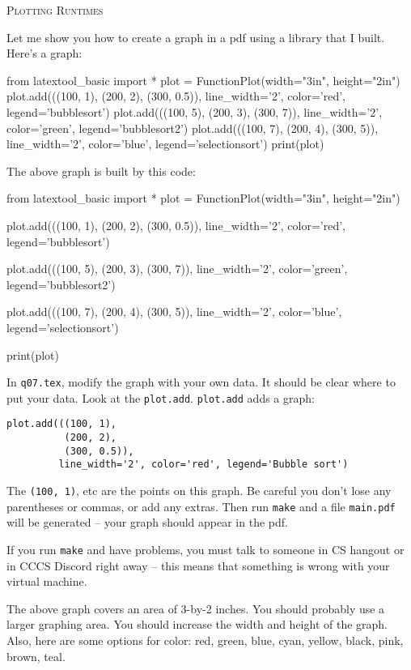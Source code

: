 \newpage\textsc{Plotting Runtimes}

Let me show you how to create a graph in a pdf using a library that I built.
Here's a graph:

\begin{python}
from latextool_basic import *
plot = FunctionPlot(width="3in", height="2in")
plot.add(((100, 1),
          (200, 2),
          (300, 0.5)),
          line_width='2', color='red', legend='bubblesort')
plot.add(((100, 5),
          (200, 3),
          (300, 7)),
          line_width='2', color='green', legend='bubblesort2')
plot.add(((100, 7),
          (200, 4),
          (300, 5)), line_width='2', color='blue', legend='selectionsort')
print(plot)
\end{python}

The above graph is built by this code:
\begin{console}[fontsize=\footnotesize]
\begin{python}
from latextool_basic import *
plot = FunctionPlot(width="3in", height="2in")

plot.add(((100, 1),
          (200, 2),
          (300, 0.5)),
         line_width='2', color='red', legend='bubblesort')
         
plot.add(((100, 5),
          (200, 3),
          (300, 7)),
         line_width='2', color='green', legend='bubblesort2')
         
plot.add(((100, 7),
          (200, 4),
          (300, 5)),
         line_width='2', color='blue', legend='selectionsort')

print(plot)
\end{python}
\end{console}

In \verb!q07.tex!, modify the graph with your own data.
It should be clear where to put your data.
Look at the \verb!plot.add!.
\verb!plot.add! adds a graph:
\begin{Verbatim}[frame=single,fontsize=\footnotesize]
plot.add(((100, 1),
          (200, 2),
          (300, 0.5)),
         line_width='2', color='red', legend='Bubble sort')
\end{Verbatim}
The \verb!(100, 1)!, etc are the points on this graph.
Be careful you don't lose any parentheses or commas, or add any extras.
Then run \verb!make! and a file \verb!main.pdf! will be
generated -- your graph should appear in the pdf.

If you run \verb!make! and have problems, you must talk to
someone in CS hangout or in CCCS Discord right away --
this means that something is wrong with your
virtual machine.

The above graph covers an area of 3-by-2 inches.
You should probably use a larger graphing area.
You should increase the width and height of the graph.
Also, here are some options for color:
red,
green,
blue,
cyan,
yellow,
black,
pink,
brown,
teal.
